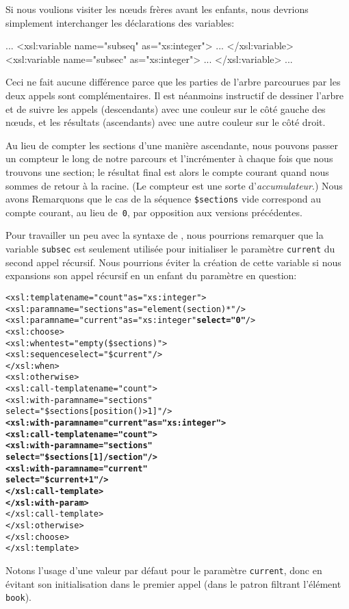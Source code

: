 Si nous voulions visiter les nœuds frères avant les enfants, nous
devrions simplement interchanger les déclarations des variables:
\begin{sverb}
      ...
        <xsl:variable name="subseq" as="xs:integer">
          ...
        </xsl:variable>
        <xsl:variable name="subsec" as="xs:integer">
          ...
        </xsl:variable>
        ...
\end{sverb}
Ceci ne fait aucune différence parce que les parties de l'arbre
parcourues par les deux appels sont complémentaires. Il est néanmoins
instructif de dessiner l'arbre \XML et de suivre les appels
(descendants) avec une couleur sur le côté gauche des nœuds, et
les résultats (ascendants) avec une autre couleur sur le côté droit.

Au lieu de compter les sections d'une manière ascendante, nous pouvons
passer un compteur le long de notre parcours et l'incrémenter à chaque
fois que nous trouvons une section; le résultat final est alors le
compte courant quand nous sommes de retour à la racine. (Le compteur
est une sorte d'\emph{accumulateur}.) Nous avons
\noindent Remarquons que le cas de la séquence \texttt{\$sections}
vide correspond au compte courant, au lieu de~\texttt{0}, par
opposition aux versions précédentes.

Pour travailler un peu avec la syntaxe de \XSLT, nous pourrions
remarquer que la variable \texttt{subsec} est seulement utilisée pour
initialiser le paramètre \texttt{current} du second appel
récursif. Nous pourrions éviter la création de cette variable si nous
expansions son appel récursif en un enfant du paramètre en question:
\begin{alltt}
\small  <xsl:template name="count" as="xs:integer">
    <xsl:param name="sections" as="element(section)*"/>
    <xsl:param name="current"  as="xs:integer" \textbf{select="0"}/>
    <xsl:choose>
      <xsl:when test="empty(\$sections)">
        <xsl:sequence select="\$current"/>
      </xsl:when>
      <xsl:otherwise>
        <xsl:call-template name="count">
          <xsl:with-param name="sections"
                          select="\$sections[position()>1]"/>
          \textbf{<xsl:with-param name="current" as="xs:integer">
            <xsl:call-template name="count">
              <xsl:with-param name="sections"
                              select="\$sections[1]/section"/>
              <xsl:with-param name="current"
                              select="\$current + 1"/>
            </xsl:call-template>
          </xsl:with-param>}
        </xsl:call-template>
      </xsl:otherwise>
    </xsl:choose>
  </xsl:template>
\end{alltt}
Notons l'usage d'une valeur par défaut pour le paramètre
\texttt{current}, donc en évitant son initialisation dans le premier
appel (dans le patron filtrant l'élément \texttt{book}).


